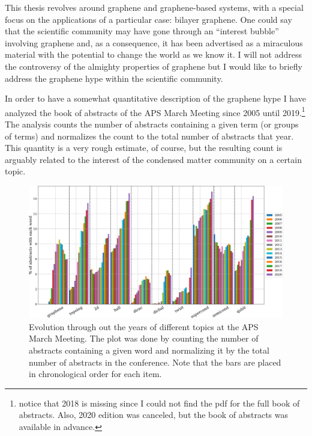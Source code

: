 
This thesis revolves around graphene and graphene-based systems, with a special focus on the applications of a particular case: bilayer graphene.
One could say that the scientific community may have gone through an ``interest bubble'' involving graphene and, as a consequence, it has been advertised as a miraculous material with the potential to change the world as we know it. I will not address the controversy of the almighty properties of graphene but I would like to briefly address the graphene hype within the scientific community.
\smallskip

In order to have a somewhat quantitative description of the graphene hype I have analyzed the book of abstracts of the APS March Meeting since 2005 until 2019.\footnote{notice that 2018 is missing since I could not find the pdf for the full book of abstracts. Also, 2020 edition was canceled, but the book of abstracts was available in advance.}
The analysis counts the number of abstracts containing a given term (or groups of terms) and normalizes the count to the total number of abstracts that year.
This quantity is a very rough estimate, of course, but the resulting count is arguably related to the interest of the condensed matter community on a certain topic.

\begin{figure}[!ht]
\centering
\includegraphics{introduction/figures/topics.png}
\vspace{-20pt}
\caption{Evolution through out the years of different topics at the APS March Meeting. The plot was done by counting the number of abstracts containing a given word and normalizing it by the total number of abstracts in the conference. Note that the bars are placed in chronological order for each item.}
\label{topics}
\end{figure}

